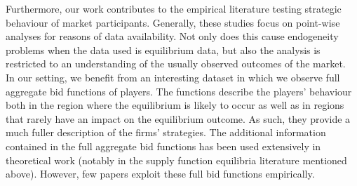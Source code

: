 %
%

Furthermore, our work contributes to the empirical literature testing strategic behaviour of market participants. 
 Generally, these studies focus on point-wise analyses for reasons of data availability. Not only does this cause endogeneity problems when the data used is equilibrium data, but also the analysis is restricted to an understanding of the usually observed outcomes of the market. \\
 
In our setting, we benefit from an interesting dataset in which we observe full aggregate bid functions of players. The functions describe the players' behaviour both in the region where the equilibrium is likely to occur as well as in regions that  rarely have an impact on the equilibrium outcome. As such, they provide a much fuller description of the firms' strategies. 
The additional information contained in the full aggregate bid functions has been used extensively in theoretical work (notably in the supply function equilibria literature mentioned above). 
However, few papers exploit these full bid functions empirically. \\

